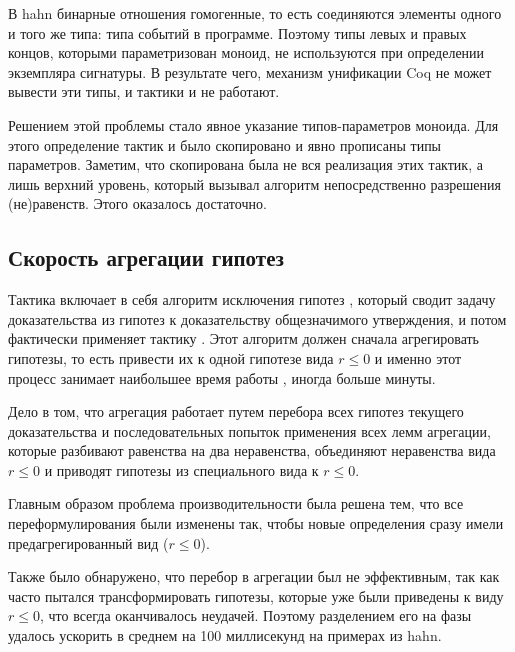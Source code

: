 \documentclass[times
              ,specification
              ,annotation
              ]{itmo-student-thesis}
\begin{document}
      В hahn бинарные отношения гомогенные, то есть соединяются элементы одного и того же
      типа: типа событий в программе. Поэтому типы левых и правых концов, которыми
      параметризован моноид, не
      используются при определении экземпляра сигнатуры. В результате чего, механизм унификации Coq не
      может вывести эти типы, и тактики  и  не работают.

      Решением этой проблемы стало явное указание типов-параметров моноида. Для этого определение
      тактик  и  было скопировано и явно прописаны типы параметров. Заметим, что
      скопирована была не вся реализация этих тактик, а лишь верхний уровень, который вызывал
      алгоритм непосредственно разрешения (не)равенств. Этого оказалось достаточно.

    \subsection{Скорость агрегации гипотез}

      Тактика  включает в себя алгоритм исключения гипотез \cite{hkat,hkat_cpc}, который
      сводит задачу доказательства из гипотез к доказательству общезначимого утверждения,
      и потом фактически применяет тактику . Этот алгоритм должен сначала агрегировать
      гипотезы, то есть привести их к одной гипотезе вида
      $r \leq 0$ и именно этот процесс занимает наибольшее время работы , иногда больше минуты.

      Дело в том, что агрегация работает путем перебора всех гипотез текущего доказательства и
      последовательных попыток
      применения всех лемм агрегации, которые разбивают равенства на два неравенства,
      объединяют неравенства вида $r \leq 0$ и приводят гипотезы из специального вида к $r \leq 0$.

      Главным образом проблема производительности была решена тем, что все переформулирования были
      изменены так, чтобы новые определения сразу имели предагрегированный вид ($r \leq 0$).

      Также было обнаружено, что перебор в агрегации был не эффективным, так как часто пытался
      трансформировать гипотезы, которые уже были приведены к виду $r \le 0$, что всегда оканчивалось
      неудачей. Поэтому разделением его на фазы удалось ускорить  в среднем на 100
      миллисекунд на примерах из hahn. 
\end{document}
